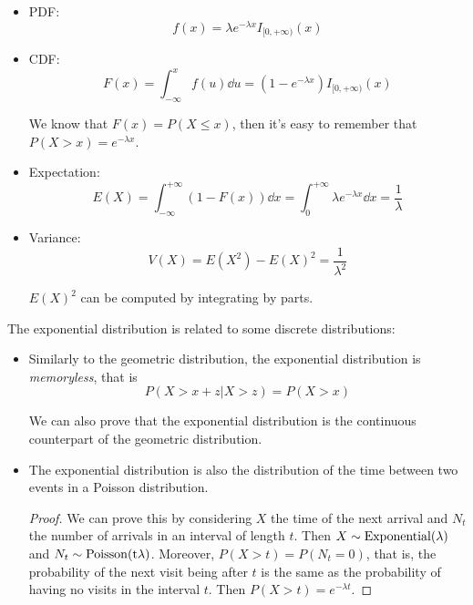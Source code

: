 \documentclass[12pt]{extarticle}
\begin{document}
\begin{itemize}
    \item PDF:
          \begin{equation}
              f(x) = \lambda e^{-\lambda x} I_{[0, +\infty)}(x)
          \end{equation}
    \item CDF:
          \begin{equation}
              F(x) = \int_{-\infty}^x f(u) \dd{u} = (1 - e^{-\lambda x})I_{[0, +\infty)}(x)
          \end{equation}

          We know that $F(x) = P(X \leq x)$, then it's easy to remember that $P(X > x) = e^{-\lambda x}$.
    \item Expectation:
          \begin{equation}
              E(X) = \int_{-\infty}^{+\infty} (1 - F(x)) \dd{x} = \int_0^{+\infty} \lambda e^{-\lambda x} \dd{x} = \frac{1}{\lambda}
          \end{equation}
    \item Variance:
          \begin{equation}
              V(X) = E(X^2) - E(X)^2 = \frac{1}{\lambda^2}
          \end{equation}

          $E(X)^2$ can be computed by integrating by parts.
\end{itemize}

The exponential distribution is related to some discrete distributions:
\begin{itemize}
    \item Similarly to the geometric distribution, the exponential distribution is \emph{memoryless}, that is
          \begin{equation}
              P(X > x + z | X > z) = P(X > x)
          \end{equation}

          We can also prove that the exponential distribution is the continuous counterpart of the geometric distribution.

    \item
          The exponential distribution is also the distribution of the time between two events in a Poisson distribution.

          \begin{proof}
              We can prove this by considering $X$ the time of the next arrival and $N_t$ the number of arrivals in an interval of length $t$.
              Then $X \sim \operatorfont{Exponential}(\lambda)$ and $N_t \sim \operatorfont{Poisson}(t \lambda)$.
              Moreover, $P(X > t) = P(N_t = 0)$, that is, the probability of the next visit being after $t$ is the same as the probability of having no visits in the interval $t$.
              Then $P(X > t) = e^{-\lambda t}$.
          \end{proof}
\end{itemize}
\end{document}

